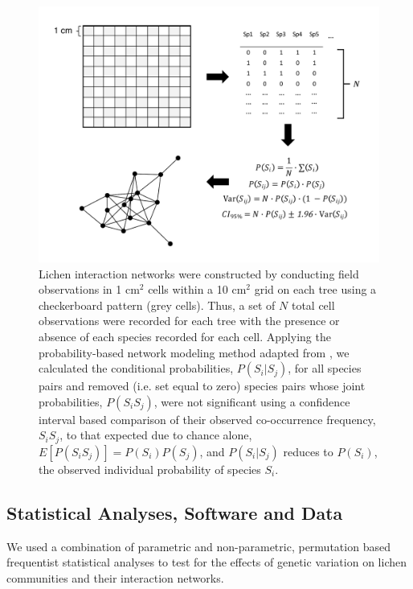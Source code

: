 \documentclass[9pt,twocolumn,twoside,lineno]{pnas-new}
\begin{document}
{\begin{figure}[ht]
\centering
\includegraphics[width=\linewidth]{lcn_araujo_method.pdf}
\caption{Lichen interaction networks were constructed by conducting
  field observations in 1 cm$^2$ cells within a 10 cm$^2$ grid on each
  tree using a checkerboard pattern (grey cells). Thus, a set of $N$
  total cell observations were recorded for each tree with the
  presence or absence of each species recorded for each cell. Applying
  the probability-based network modeling method adapted from
  \cite{Araujo2011}, we calculated the conditional probabilities,
  $P(S_i|S_j)$, for all species pairs and removed (i.e. set equal to
  zero) species pairs whose joint probabilities, $P(S_i S_j)$, were
  not significant using a confidence interval based comparison of
  their observed co-occurrence frequency, $S_iS_j$, to that expected
  due to chance alone, $E[P(S_iS_j)] = P(S_i) P(S_j)$, and
  $P(S_i|S_j)$ reduces to $P(S_i)$, the observed individual
  probability of species $S_i$.}
\label{fig:conet_method}
\end{figure}



\subsection*{Statistical Analyses, Software and Data}

We used a combination of parametric and non-parametric, permutation
based frequentist statistical analyses to test for the effects of
genetic variation on lichen communities and their interaction
networks. 

}
\end{document}
